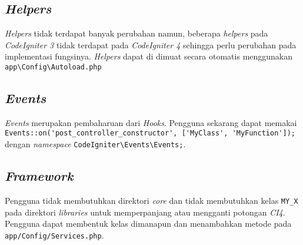 \subsection{\textit{Helpers}}
 
\textit{Helpers} tidak terdapat banyak perubahan namun, beberapa \textit{helpers} pada \textit{CodeIgniter 3} tidak terdapat pada \textit{CodeIgniter 4} sehingga perlu perubahan pada implementasi fungsinya. \textit{Helpers} dapat di dimuat secara otomatis menggunakan \verb|app\Config\Autoload.php|

\subsection{\textit{Events}}
\textit{Events} merupakan pembaharuan dari \textit{Hooks}. Pengguna sekarang dapat memakai \verb|Events::on('post_controller_constructor', ['MyClass', 'MyFunction']);| dengan \textit{namespace} \verb|CodeIgniter\Events\Events;|.

\subsection{\textit{Framework}}
Pengguna tidak membutuhkan direktori \textit{core} dan tidak membutuhkan kelas \verb|MY_X| pada direktori \textit{libraries} untuk memperpanjang atau mengganti potongan \textit{CI4}. Pengguna dapat membentuk kelas dimanapun dan menambahkan metode pada \verb|app/Config/Services.php|.


